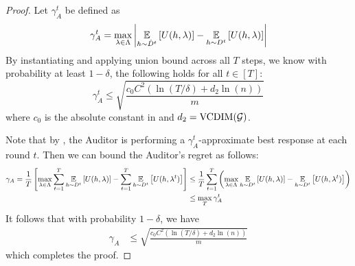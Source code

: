 \auditorbr*

\begin{proof}
  Let $\gamma_A^t$ be defined as
  \[
    \gamma_A^t = \max_{\lambda\in \Lambda} \left| \operatorname*{\mathbb{E}}_{h\sim \hat
        D^t}\left[U(h, \lambda)\right] - \operatorname*{\mathbb{E}}_{h\sim D^t}\left[U(h, \lambda)\right] \right|
  \]
  By instantiating  and applying union bound
  across all $T$ steps, we know with probability at least
  $1 - \delta$, the following holds for all $t\in [T]$:
  \[
    {\gamma_A^t} \leq \sqrt{\frac{c_0 C^2 (\ln(T/\delta) + d_2
        \ln(n))}{m}}
  \]
  where $c_0$ is the absolute constant in  and
  $d_2 = \mathrm{VCDIM}(\mathcal{G})$. 

  Note that by , the Auditor is performing a
  $\gamma_A^t$-approximate best response at each round $t$. Then we
  can bound the Auditor's regret as follows:
  \begin{align*}
    \gamma_A = \frac{1}{T}\left[\max_{\lambda\in \Lambda} \sum_{t=
    1}^T \operatorname*{\mathbb{E}}_{h\sim D^t}\left[U(h, \lambda)\right] - \sum_{t=1}^T \operatorname*{\mathbb{E}}_{h\sim
    D^t}\left[U(h, \lambda^t)\right]\right] &\leq \frac{1}{T}\sum_{t=
                                   1}^T\left( \max_{\lambda\in \Lambda} \operatorname*{\mathbb{E}}_{h\sim D^t}\left[U(h, \lambda)\right] - \operatorname*{\mathbb{E}}_{h\sim
                                   D^t}\left[U(h, \lambda^t)\right] \right)  \\
                                 &\leq \max_T \gamma_A^t
  \end{align*}
  It follows that with probability $1 - \delta$, we have
\begin{align*}
  \gamma_A &\leq \sqrt{\frac{c_0 C^2 (\ln(T/\delta) + d_2
        \ln(n))}{m}}
\end{align*}
which completes the proof.
\end{proof}

\iffalse
\polytime*

